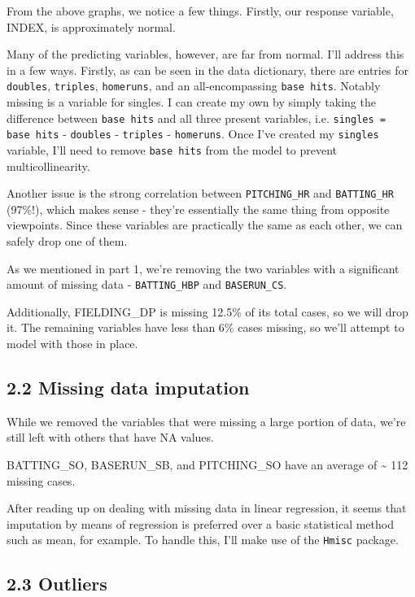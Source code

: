 \documentclass[]{article}
\begin{document}
From the above graphs, we notice a few things. Firstly, our response
variable, INDEX, is approximately normal.

Many of the predicting variables, however, are far from normal. I'll
address this in a few ways. Firstly, as can be seen in the data
dictionary, there are entries for \texttt{doubles}, \texttt{triples},
\texttt{homeruns}, and an all-encompassing \texttt{base\ hits}. Notably
missing is a variable for singles. I can create my own by simply taking
the difference between \texttt{base\ hits} and all three present
variables, i.e. \texttt{singles\ =} \texttt{base\ hits} -
\texttt{doubles} - \texttt{triples} - \texttt{homeruns}. Once I've
created my \texttt{singles} variable, I'll need to remove
\texttt{base\ hits} from the model to prevent multicollinearity.

Another issue is the strong correlation between \texttt{PITCHING\_HR}
and \texttt{BATTING\_HR} (97\%!), which makes sense - they're
essentially the same thing from opposite viewpoints. Since these
variables are practically the same as each other, we can safely drop one
of them.

As we mentioned in part 1, we're removing the two variables with a
significant amount of missing data - \texttt{BATTING\_HBP} and
\texttt{BASERUN\_CS}.

Additionally, FIELDING\_DP is missing 12.5\% of its total cases, so we
will drop it. The remaining variables have less than 6\% cases missing,
so we'll attempt to model with those in place.

\subsection{2.2 Missing data imputation}\label{missing-data-imputation}

While we removed the variables that were missing a large portion of
data, we're still left with others that have NA values.

BATTING\_SO, BASERUN\_SB, and PITCHING\_SO have an average of
\textasciitilde{} 112 missing cases.

After reading up on dealing with missing data in linear regression, it
seems that imputation by means of regression is preferred over a basic
statistical method such as mean, for example. To handle this, I'll make
use of the \texttt{Hmisc} package.

\subsection{2.3 Outliers}\label{outliers}
\end{document}

